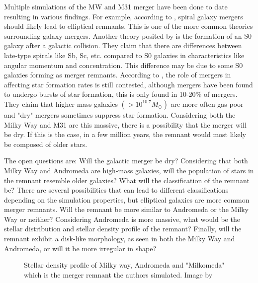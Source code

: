 \documentclass[preprint2, times]{aastex631}
\begin{document}
Multiple simulations of the MW and M31 merger have been done to date resulting in various findings. For example, according to \citet{Toomre_1972}, spiral galaxy mergers should likely lead to elliptical remnants. This is one of the more common theories surrounding galaxy mergers. Another theory posited by \citet{Querejeta_2015} is the formation of an S0 galaxy after a galactic collision. They claim that there are differences between late-type spirals like Sb, Sc, etc. compared to S0 galaxies in characteristics like angular momentum and concentration. This difference may be due to some S0 galaxies forming as merger remnants. According to \citet{Pearson_2019}, the role of mergers in affecting star formation rates is still contested, although mergers have been found to undergo bursts of star formation, this is only found in 10-20\% of mergers. They claim that higher mass galaxies $(> 10^{10.7}M_\odot)$ are more often gas-poor and "dry" mergers sometimes suppress star formation. Considering both the Milky Way and M31 are this massive, there is a possibility that the merger will be dry.  If this is the case, in a few million years, the remnant would most likely be composed of older stars.\par
The open questions are: Will the galactic merger be dry? Considering that both Milky Way and Andromeda are high-mass galaxies, will the population of stars in the remnant resemble older galaxies?
What will the classification of the remnant be? There are several possibilities that can lead to different classifications depending on the simulation properties, but elliptical galaxies are more common merger remnants. 
Will the remnant be more similar to Andromeda or the Milky Way or neither? Considering Andromeda is more massive, what would be the stellar distribution and stellar density profile of the remnant? Finally, will the remnant exhibit a disk-like morphology, as seen in both the Milky Way and Andromeda, or will it be more irregular in shape?
\begin{figure}
    \centering
    \caption{Stellar density profile of Milky way, Andromeda and "Milkomeda" which is the merger remnant the authors simulated. Image by \citet{Schiavi_2020} }
    \label{fig:galaxy}
\end{figure}
\vspace{5 mm}
\end{document}
